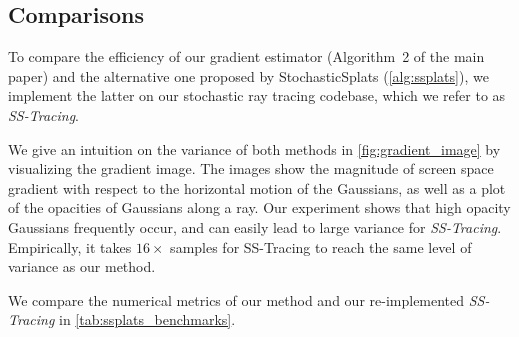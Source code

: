 \subsection{Comparisons}
\label{ssec:ssplats_comp}
%
To compare the efficiency of our gradient estimator (Algorithm~2 of the main paper) and the alternative one proposed by StochasticSplats (\autoref{alg:ssplats}), we implement the latter on our stochastic ray tracing codebase, which we refer to as \textsl{SS-Tracing}.

We give an intuition on the variance of both methods in \autoref{fig:gradient_image} by visualizing the gradient image. The images show the magnitude of screen space gradient with respect to the horizontal motion of the Gaussians, as well as a plot of the opacities of Gaussians along a ray. Our experiment shows that high opacity Gaussians frequently occur, and can easily lead to large variance for \textsl{SS-Tracing}. Empirically, it takes $16\times$ samples for SS-Tracing to reach the same level of variance as our method. 




We compare the numerical metrics of our method and our re-implemented \textsl{SS-Tracing} in \autoref{tab:ssplats_benchmarks}.